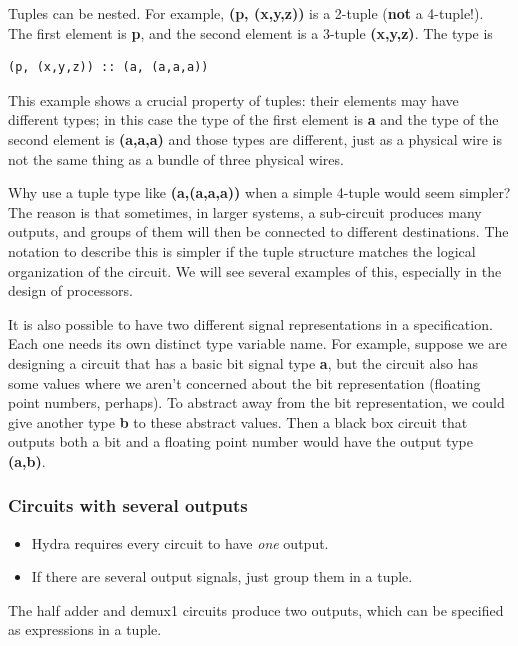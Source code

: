 \documentclass[]{svmono}
\begin{document}
Tuples can be nested.  For example, \textbf{(p, (x,y,z))} is a 2-tuple
(\textbf{not} a 4-tuple!).  The first element is \textbf{p}, and the second
element is a 3-tuple \textbf{(x,y,z)}.  The type is


\begin{verbatim}
(p, (x,y,z)) :: (a, (a,a,a))
\end{verbatim}

This example shows a crucial property of tuples: their elements may
have different types; in this case the type of the first element is
\textbf{a} and the type of the second element is \textbf{(a,a,a)} and those types
are different, just as a physical wire is not the same thing as a
bundle of three physical wires.

Why use a tuple type like \textbf{(a,(a,a,a))} when a simple 4-tuple would
seem simpler?  The reason is that sometimes, in larger systems, a
sub-circuit produces many outputs, and groups of them will then be
connected to different destinations.  The notation to describe this is
simpler if the tuple structure matches the logical organization of the
circuit.  We will see several examples of this, especially in the
design of processors.

It is also possible to have two different signal representations in a
specification.  Each one needs its own distinct type variable name.
For example, suppose we are designing a circuit that has a basic bit
signal type \textbf{a}, but the circuit also has some values where we aren't
concerned about the bit representation (floating point numbers,
perhaps).  To abstract away from the bit representation, we could give
another type \textbf{b} to these abstract values.  Then a black box circuit
that outputs both a bit and a floating point number would have the
output type \textbf{(a,b)}.
\subsubsection*{Circuits with several outputs}
\label{sec:org373703d}

\begin{itemize}
\item Hydra requires every circuit to have \emph{one} output.
\item If there are several output signals, just group them in a tuple.
\end{itemize}

The half adder and demux1 circuits produce two outputs, which can
be specified as expressions in a tuple.
\end{document}
